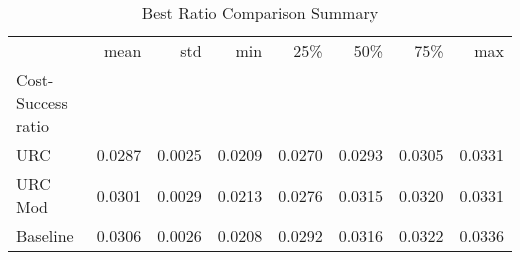 \begin{table}
\caption{Best Ratio Comparison Summary}
\begin{tabular}{lrrrrrrr}
\toprule
 & mean & std & min & 25\% & 50\% & 75\% & max \\
Cost-Success ratio &  &  &  &  &  &  &  \\
\midrule
URC & 0.0287 & 0.0025 & 0.0209 & 0.0270 & 0.0293 & 0.0305 & 0.0331 \\
URC Mod & 0.0301 & 0.0029 & 0.0213 & 0.0276 & 0.0315 & 0.0320 & 0.0331 \\
Baseline & 0.0306 & 0.0026 & 0.0208 & 0.0292 & 0.0316 & 0.0322 & 0.0336 \\
\bottomrule
\end{tabular}
\end{table}
